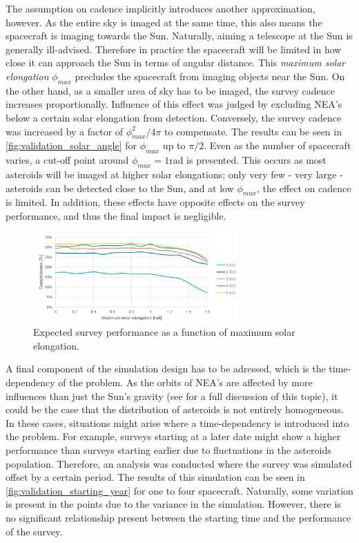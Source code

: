 The assumption on cadence implicitly introduces another approximation, however. As the entire sky is imaged at the same time, this also means the spacecraft is imaging towards the Sun. Naturally, aiming a telescope at the Sun is generally ill-advised. Therefore in practice the spacecraft will be limited in how close it can approach the Sun in terms of angular distance. This \textit{maximum solar elongation} $\phi_{max}$ precludes the spacecraft from imaging objects near the Sun. On the other hand, as a smaller area of sky has to be imaged, the survey cadence increases proportionally. Influence of this effect was judged by excluding NEA's below a certain solar elongation from detection. Conversely, the survey cadence was increased by a factor of $\phi_{max}^2 / 4\pi$ to compensate. The results can be seen in \autoref{fig:validation_solar_angle} for $\phi_{max}$ up to $\pi/2$. Even as the number of spacecraft varies, a cut-off point around $\phi_{max} = 1\mathrm{rad}$ is presented. This occurs as most asteroids will be imaged at higher solar elongations; only very few - very large - asteroids can be detected close to the Sun, and at low $\phi_{max}$, the effect on cadence is limited. In addition, these effects have opposite effects on the survey performance, and thus the final impact is negligible.

\begin{figure}[htbp]
 \centering
 \includegraphics[width=0.7\textwidth]{img/validation_solar_angle.png}
 \caption{Expected survey performance as a function of maximum solar elongation.}
 \label{fig:validation_solar_angle}
\end{figure}

A final component of the simulation design has to be adressed, which is the time-dependency of the problem. As the orbits of NEA's are affected by more influences than just the Sun's gravity (see \cite{GranvikPopulation} for a full discussion of this topic), it could be the case that the distribution of asteroids is not entirely homogeneous. In these cases, situations might arise where a time-dependency is introduced into the problem. For example, surveys starting at a later date might show a higher performance than surveys starting earlier due to fluctuations in the asteroids population. Therefore, an analysis was conducted where the survey was simulated offset by a certain period. The results of this simulation can be seen in \autoref{fig:validation_starting_year} for one to four spacecraft. Naturally, some variation is present in the points due to the variance in the simulation. However, there is no significant relationship present between the starting time and the performance of the survey.

